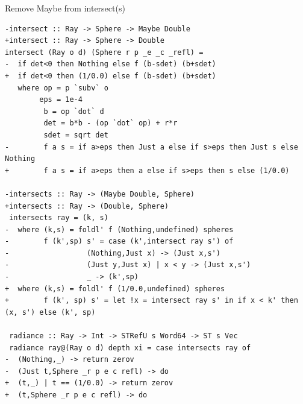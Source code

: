 \documentclass[8pt]{beamer}
\begin{document}
\begin{frame}[fragile]{Remove Maybe from intersect(s)}
\begin{verbatim}
-intersect :: Ray -> Sphere -> Maybe Double
+intersect :: Ray -> Sphere -> Double
intersect (Ray o d) (Sphere r p _e _c _refl) =
-  if det<0 then Nothing else f (b-sdet) (b+sdet)
+  if det<0 then (1/0.0) else f (b-sdet) (b+sdet)
   where op = p `subv` o
        eps = 1e-4
         b = op `dot` d
         det = b*b - (op `dot` op) + r*r
         sdet = sqrt det
-        f a s = if a>eps then Just a else if s>eps then Just s else Nothing
+        f a s = if a>eps then a else if s>eps then s else (1/0.0)

-intersects :: Ray -> (Maybe Double, Sphere)
+intersects :: Ray -> (Double, Sphere)
 intersects ray = (k, s)
-  where (k,s) = foldl' f (Nothing,undefined) spheres
-        f (k',sp) s' = case (k',intersect ray s') of
-                  (Nothing,Just x) -> (Just x,s')
-                  (Just y,Just x) | x < y -> (Just x,s')
-                  _ -> (k',sp)
+  where (k,s) = foldl' f (1/0.0,undefined) spheres
+        f (k', sp) s' = let !x = intersect ray s' in if x < k' then (x, s') else (k', sp)
 
 radiance :: Ray -> Int -> STRefU s Word64 -> ST s Vec
 radiance ray@(Ray o d) depth xi = case intersects ray of
-  (Nothing,_) -> return zerov
-  (Just t,Sphere _r p e c refl) -> do
+  (t,_) | t == (1/0.0) -> return zerov
+  (t,Sphere _r p e c refl) -> do
\end{verbatim}
\end{frame}
\end{document}
